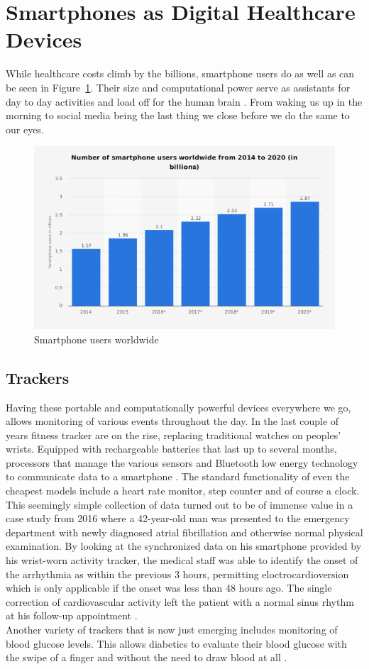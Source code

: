 \section{Smartphones as Digital Healthcare Devices}
While healthcare costs climb by the billions, smartphone users do as well as can be seen in Figure~\ref{fig:graphical_statistics_of_smartphone_users}. Their size and computational power serve as assistants for day to day activities and load off for the human brain \cite{barr2015brain}. From waking us up in the morning to social media being the last thing we close before we do the same to our eyes.
\begin{figure}[htpb]
    \centering
    \includegraphics[width=0.8\linewidth]{media/Graphical-statistics-of-smartphone-users.png}
    \caption{Smartphone users worldwide \cite{numSmartphones}}%
    \label{fig:graphical_statistics_of_smartphone_users}
\end{figure}
\label{sec:smartphoneChances}
\subsection{Trackers}
Having these portable and computationally powerful devices everywhere we go, allows monitoring of various events throughout the day. In the last couple of years fitness tracker are on the rise, replacing traditional watches on peoples' wrists. Equipped with rechargeable batteries that last up to several months, processors that manage the various sensors and Bluetooth low energy technology to communicate data to a smartphone \cite{trackerDef}. The standard functionality of even the cheapest models include a heart rate monitor, step counter and of course a clock. This seemingly simple collection of data turned out to be of immense value in a case study from 2016 where a 42-year-old man was presented to the emergency department with newly diagnosed atrial fibrillation and otherwise normal physical examination. By looking at the synchronized data on his smartphone provided by his wrist-worn activity tracker, the medical staff was able to identify the onset of the arrhythmia as within the previous 3 hours, permitting eloctrocardioversion which is only applicable if the onset was less than 48 hours ago. The single correction of cardiovascular activity left the patient with a normal sinus rhythm at his follow-up appointment \cite{rudner2016interrogation}. \\
Another variety of trackers that is now just emerging includes monitoring of blood glucose levels. This allows diabetics to evaluate their blood glucose with the swipe of a finger and without the need to draw blood at all \cite{glucoseTracker}.
